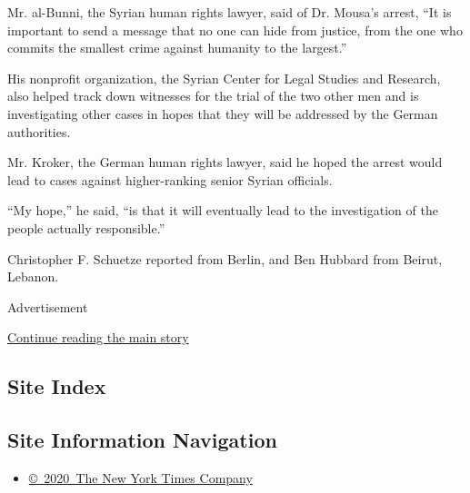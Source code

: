 Mr. al-Bunni, the Syrian human rights lawyer, said of Dr. Mousa's
arrest, ``It is important to send a message that no one can hide from
justice, from the one who commits the smallest crime against humanity to
the largest.''

His nonprofit organization, the Syrian Center for Legal Studies and
Research, also helped track down witnesses for the trial of the two
other men and is investigating other cases in hopes that they will be
addressed by the German authorities.

Mr. Kroker, the German human rights lawyer, said he hoped the arrest
would lead to cases against higher-ranking senior Syrian officials.

``My hope,'' he said, ``is that it will eventually lead to the
investigation of the people actually responsible.''

Christopher F. Schuetze reported from Berlin, and Ben Hubbard from
Beirut, Lebanon.

Advertisement

\protect\hyperlink{after-bottom}{Continue reading the main story}

\hypertarget{site-index}{%
\subsection{Site Index}\label{site-index}}

\hypertarget{site-information-navigation}{%
\subsection{Site Information
Navigation}\label{site-information-navigation}}

\begin{itemize}
\tightlist
\item
  \href{https://help.nytimes3xbfgragh.onion/hc/en-us/articles/115014792127-Copyright-notice}{©~2020~The
  New York Times Company}
\end{itemize}

